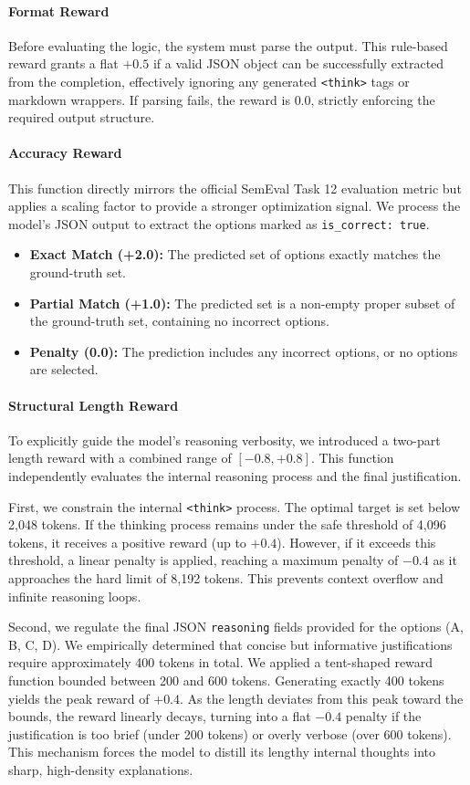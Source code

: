 \documentclass{article}
\begin{document}
\paragraph{Format Reward}
Before evaluating the logic, the system must parse the output. This rule-based reward grants a flat $+0.5$ if a valid JSON object can be successfully extracted from the completion, effectively ignoring any generated \texttt{<think>} tags or markdown wrappers. If parsing fails, the reward is $0.0$, strictly enforcing the required output structure.

\paragraph{Accuracy Reward}
This function directly mirrors the official SemEval Task 12 evaluation metric but applies a scaling factor to provide a stronger optimization signal. We process the model's JSON output to extract the options marked as \texttt{is_correct: true}.
\begin{itemize}
\item \textbf{Exact Match (+2.0):} The predicted set of options exactly matches the ground-truth set.
\item \textbf{Partial Match (+1.0):} The predicted set is a non-empty proper subset of the ground-truth set, containing no incorrect options.
\item \textbf{Penalty (0.0):} The prediction includes any incorrect options, or no options are selected.
\end{itemize}

\paragraph{Structural Length Reward}
To explicitly guide the model's reasoning verbosity, we introduced a two-part length reward with a combined range of $[-0.8, +0.8]$. This function independently evaluates the internal reasoning process and the final justification.

First, we constrain the internal \texttt{<think>} process. The optimal target is set below 2,048 tokens. If the thinking process remains under the safe threshold of 4,096 tokens, it receives a positive reward (up to $+0.4$). However, if it exceeds this threshold, a linear penalty is applied, reaching a maximum penalty of $-0.4$ as it approaches the hard limit of 8,192 tokens. This prevents context overflow and infinite reasoning loops.

Second, we regulate the final JSON \texttt{reasoning} fields provided for the options (A, B, C, D). We empirically determined that concise but informative justifications require approximately 400 tokens in total. We applied a tent-shaped reward function bounded between 200 and 600 tokens. Generating exactly 400 tokens yields the peak reward of $+0.4$. As the length deviates from this peak toward the bounds, the reward linearly decays, turning into a flat $-0.4$ penalty if the justification is too brief (under 200 tokens) or overly verbose (over 600 tokens). This mechanism forces the model to distill its lengthy internal thoughts into sharp, high-density explanations.
\end{document}
